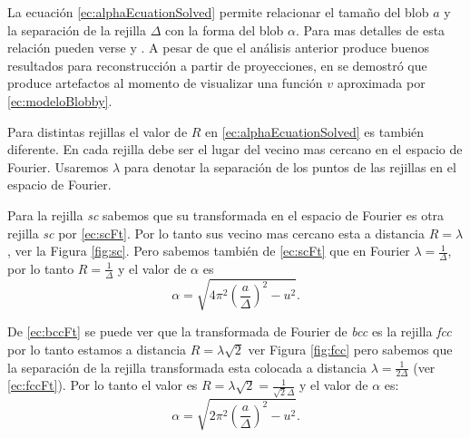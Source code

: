 % 
% 
La ecuación \eqref{ec:alphaEcuationSolved} permite relacionar el tamaño del blob $a$ y la separación de la rejilla $\Delta$ con la forma del blob $\alpha$. Para mas detalles de esta relación pueden verse \cite{Edgar:Thesis} y \cite{EdgarOptimization}. A pesar de que el análisis anterior produce buenos resultados para reconstrucción a partir de proyecciones, en \cite{EdgarOptimization} se demostró que produce artefactos al momento de visualizar una función $v$ aproximada por \eqref{ec:modeloBlobby}.

Para distintas rejillas el valor de $R$ en \eqref{ec:alphaEcuationSolved} es también diferente. En cada rejilla debe ser el lugar del vecino mas cercano en el espacio de Fourier. Usaremos $\lambda$ para denotar la separación de los puntos de las rejillas en el espacio de Fourier. 

Para la rejilla \emph{sc} sabemos que su transformada en el espacio de Fourier es otra rejilla \emph{sc} por \eqref{ec:scFt}. Por lo tanto sus vecino mas cercano esta a distancia $R = \lambda$, ver la Figura \ref{fig:sc}. Pero sabemos también de \eqref{ec:scFt} que en Fourier $\lambda = \frac{1}{\Delta}$, por lo tanto $R = \frac{1}{\Delta}$ y el valor de $\alpha$ es
\begin{equation}
  \alpha = \sqrt{4 \pi^2 \left( \frac{a}{\Delta} \right) ^2 - u^2}.
  \label{ec:deltaSC}
\end{equation}
 
De \eqref{ec:bccFt} se puede ver que la transformada de Fourier de \emph{bcc} es la rejilla \emph{fcc} por lo tanto estamos a distancia $R = \lambda\sqrt{2}$ ver Figura \ref{fig:fcc} pero sabemos que la separación de la rejilla transformada esta colocada a distancia $\lambda = \frac{1}{2 \Delta}$ (ver \eqref{ec:fccFt}). Por lo tanto el valor es $R = \lambda\sqrt{2} = \frac{1}{\sqrt{2} \Delta}$ y el valor de $\alpha$ es:
\begin{equation}
  \alpha = \sqrt{2 \pi^2 \left( \frac{a}{\Delta} \right) ^2 - u^2}.
  \label{ec:deltaBCC}
\end{equation}

